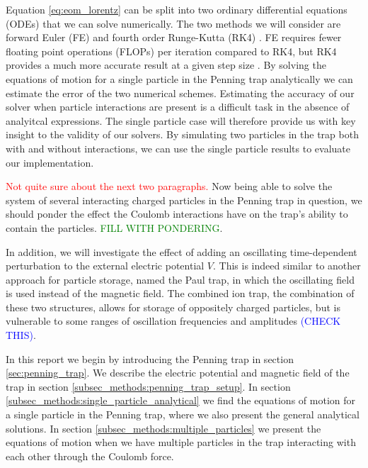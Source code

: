 Equation \eqref{eq:eom_lorentz} can be split into two ordinary differential equations (ODEs) that we can solve numerically. The two methods we will consider are forward Euler (FE) and fourth order Runge-Kutta (RK4) . FE requires fewer floating point operations (FLOPs) per iteration compared to RK4, but RK4 provides a much more accurate result at a given step size . By solving the equations of motion for a single particle in the Penning trap analytically we can estimate the error of the two numerical schemes. Estimating the accuracy of our solver when particle interactions are present is a difficult task in the absence of analyitcal expressions. The single particle case will therefore provide us with key insight to the validity of our solvers. By simulating two particles in the trap both with and without interactions, we can use the single particle results to evaluate our implementation.   



\textcolor{red}{Not quite sure about the next two paragraphs. }
Now being able to solve the system of several interacting charged particles in the Penning trap in question, we should ponder the effect the Coulomb interactions have on the trap's ability to contain the particles. 
\textcolor{green}{FILL WITH PONDERING}. 

In addition, we will investigate the effect of adding an oscillating time-dependent perturbation to the external electric potential $V$. This is indeed similar to another approach for particle storage, named the Paul trap, in which the oscillating field is used instead of the magnetic field. The combined ion trap, the combination of these two structures, allows for storage of oppositely charged particles, but is vulnerable to some ranges of oscillation frequencies and amplitudes \textcolor{blue}{(CHECK THIS)}.


In this report we begin by introducing the Penning trap in section \ref{sec:penning_trap}. We describe the electric potential and magnetic field of the trap in section \ref{subsec_methods:penning_trap_setup}. In section \ref{subsec_methods:single_particle_analytical} we find the equations of motion for a single particle in the Penning trap, where we also present the general analytical solutions. In section \ref{subsec_methods:multiple_particles} we present the equations of motion when we have multiple particles in the trap interacting with each other through the Coulomb force. 


